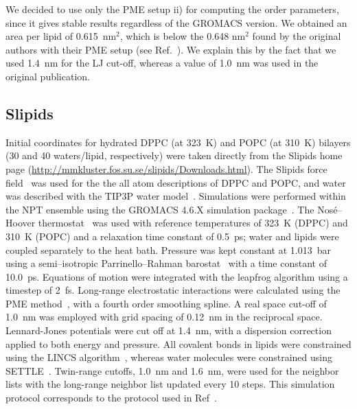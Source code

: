 \documentclass[journal=jacsat,manuscript=article]{achemso}
\begin{document}
We decided to use only the PME setup ii) for computing the order parameters, since it gives stable results regardless of the GROMACS version. We obtained an area per 
lipid of 0.615~nm$^2$, which is below the 0.648 nm$^2$ found by the original authors with their PME setup (see Ref.~). We explain this by the fact that we used
1.4~nm for the LJ cut-off, whereas a value of 1.0~nm was used in the original publication. 

\subsection{Slipids}
Initial coordinates for hydrated DPPC (at 323~K) and POPC (at 310~K) bilayers (30 and 40 waters/lipid, respectively) were taken directly from the 
Slipids home page (\url{http://mmkluster.fos.su.se/slipids/Downloads.html}).  The Slipids force field~\cite{jambeck12,jambeck12b} was used for the the all atom descriptions of DPPC and POPC, and
water was described with the TIP3P water model~\cite{jorgensen83}. Simulations were performed within the NPT ensemble using the GROMACS 4.6.X simulation
package~\cite{hess08}. The Nos\'{e}--Hoover thermostat~\cite{nose84,hoover85} was used with reference temperatures of
323~K (DPPC) and 310~K (POPC) and a relaxation time constant of 0.5~ps; water and lipids were coupled separately to
the heat bath. Pressure was kept constant at 1.013~bar using a semi--isotropic Parrinello--Rahman
barostat~\cite{parrinello81} with a time constant of 10.0~ps. Equations of motion were
integrated with the leapfrog algorithm using a timestep of 2~fs. Long-range
electrostatic interactions were calculated using the PME method~\cite{darden93,essman95}, with a fourth order
smoothing spline. A real space cut-off of 1.0~nm was employed with grid spacing of 0.12~nm in the reciprocal space.
Lennard-Jones potentials were cut off at 1.4~nm, with a dispersion correction applied to both energy and pressure. All covalent bonds in lipids were constrained using the LINCS algorithm~\cite{hess97}, 
whereas water molecules were constrained using SETTLE~\cite{miyamoto92}. Twin-range cutoffs,
1.0~nm and 1.6~nm, were used for the neighbor lists with the long-range neighbor list updated every
10 steps. This simulation protocol corresponds to the protocol used in Ref~. 
\end{document}
